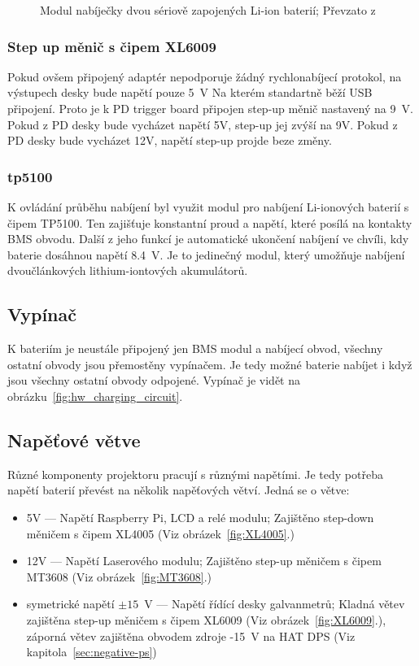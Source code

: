 \begin{figure}[htb]
\begin{minipage}{0.3\textwidth}
    \caption{\label{fig:TP5100} Modul nabíječky dvou sériově zapojených Li-ion baterií; Převzato z~\cite{laskakit-TP5100}}
  \end{minipage}
\end{figure}

\subsubsection{Step up měnič s čipem XL6009}
Pokud ovšem připojený adaptér nepodporuje žádný rychlonabíjecí protokol, na výstupech desky bude napětí pouze 5~V Na kterém standartně běží USB připojení. Proto je k PD trigger board připojen step-up měnič nastavený na 9~V.
Pokud z PD desky bude vycházet napětí 5V, step-up jej zvýší na 9V. Pokud z PD desky bude vycházet 12V, napětí step-up projde beze změny.

\subsubsection{tp5100}
K ovládání průběhu nabíjení byl využit modul pro nabíjení Li-ionových baterií s čipem TP5100. Ten zajišťuje konstantní proud a napětí, které posílá na kontakty BMS obvodu. Další z jeho funkcí je automatické ukončení nabíjení ve chvíli, kdy baterie dosáhnou napětí 8.4~V. Je to jedinečný modul, který umožňuje nabíjení dvoučlánkových lithium-iontových akumulátorů.

\subsection{Vypínač}
K bateriím je neustále připojený jen BMS modul a nabíjecí obvod, všechny ostatní obvody jsou přemostěny vypínačem. Je tedy možné baterie nabíjet i když jsou všechny ostatní obvody odpojené. Vypínač je vidět na obrázku~\ref{fig:hw_charging_circuit}.

\subsection{Napěťové větve}
Různé komponenty projektoru pracují s různými napětími. Je tedy potřeba napětí baterií převést na několik napěťových větví. Jedná se o větve:

\begin{itemize}
  \item 5V --- Napětí Raspberry Pi, LCD a relé modulu; Zajištěno step-down měničem s čipem XL4005 (Viz obrázek~\ref{fig:XL4005}.)
  \item 12V --- Napětí Laserového modulu; Zajištěno step-up měničem s čipem MT3608 (Viz obrázek~\ref{fig:MT3608}.)
  \item symetrické napětí $\pm{}15$~V --- Napětí řídící desky galvanmetrů; Kladná větev zajištěna step-up měničem s čipem XL6009 (Viz obrázek~\ref{fig:XL6009}.), záporná větev zajištěna obvodem zdroje -15~V na HAT DPS (Viz kapitola~\ref{sec:negative-ps})
\end{itemize}


